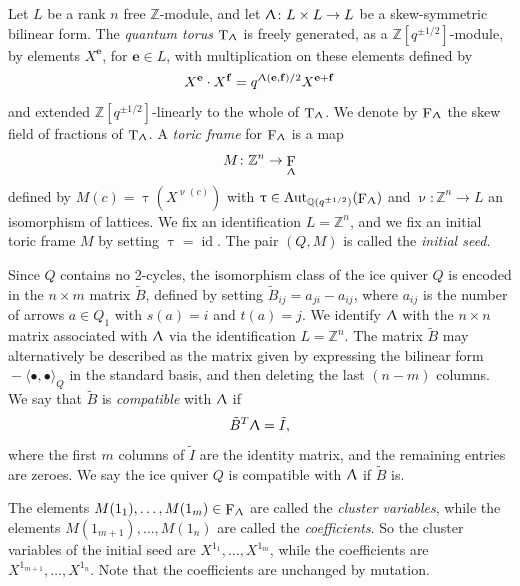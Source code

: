 \documentclass[a4paper,10pt]{amsart}
\newcommand{\ee}{\mathbf{e}}
\newcommand{\ff}{\mathbf{f}}
\renewcommand{\Lambda}{\Uplambda}
\renewcommand{\nu}{\upnu}
\renewcommand{\tau}{\uptau}
\DeclareMathOperator{\Tor}{T}
\DeclareMathOperator{\For}{F}
\DeclareMathOperator{\Aut}{Aut}
\DeclareMathOperator{\id}{id}
\begin{document}
Let $L$ be a rank $n$ free $\mathbb{Z}$-module, and let $\Lambda\colon L\times L\rightarrow L$ be a skew-symmetric bilinear form.  The \textit{quantum torus} $\Tor_{\Lambda}$ is freely generated, as a $\mathbb{Z}[q^{\pm 1/2}]$-module, by elements $X^\ee$, for $\ee\in L$, with multiplication on these elements defined by
\begin{equation}
\label{LambdaMult}
X^\ee\cdot X^\ff=q^{\Lambda(\ee,\ff)/2}X^{\ee+\ff}
\end{equation}
and extended $\mathbb{Z}[q^{\pm 1/2}]$-linearly to the whole of $\Tor_{\Lambda}$.  We denote by $\For_{\Lambda}$ the skew field of fractions of $\Tor_{\Lambda}$.  A \textit{toric frame} for $\For_{\Lambda}$ is a map
\[
M\colon \mathbb{Z}^n\rightarrow \For_{\Lambda}
\]
defined by $M(c)=\tau(X^{\nu(c)})$ with $\tau\in\Aut_{\mathbb{Q}(q^{\pm 1/2})}(\For_{\Lambda})$ and $\nu\colon \mathbb{Z}^n\rightarrow L$ an isomorphism of lattices.  We fix an identification $L=\mathbb{Z}^n$, and we fix an initial toric frame $M$ by setting $\tau=\id$.  The pair $(Q,M)$ is called the \textit{initial seed}.

Since $Q$ contains no 2-cycles, the isomorphism class of the ice quiver $Q$ is encoded in the $n\times m$ matrix $\tilde{B}$, defined by setting $\tilde{B}_{ij}=a_{ji}-a_{ij}$, where $a_{ij}$ is the number of arrows $a\in Q_1$ with $s(a)=i$ and $t(a)=j$.  We identify $\Lambda$ with the $n\times n$ matrix associated with $\Lambda$ via the identification $L=\mathbb{Z}^n$.  The matrix $\tilde{B}$ may alternatively be described as the matrix given by expressing the bilinear form ${}-\langle\bullet,\bullet\rangle_Q$ in the standard basis, and then deleting the last $(n-m)$ columns.  We say that $\tilde{B}$ is \textit{compatible} with $\Lambda$ if 
\begin{equation}
\label{compatibility}
\tilde{B}^T\Lambda=\tilde{I},
\end{equation}
where the first $m$ columns of $\tilde{I}$ are the identity matrix, and the remaining entries are zeroes.  We say the ice quiver $Q$ is compatible with $\Lambda$ if $\tilde{B}$ is.




The elements $M(1_1),\ldots,M(1_m)\in \For_{\Lambda}$ are called the \textit{cluster variables}, while the elements $M(1_{m+1}),\ldots,M(1_n)$ are called the \textit{coefficients}.  So the cluster variables of the initial seed are $X^{1_1},\ldots,X^{1_m}$, while the coefficients are $X^{1_{m+1}},\ldots,X^{1_n}$.  Note that the coefficients are unchanged by mutation.
\end{document}
